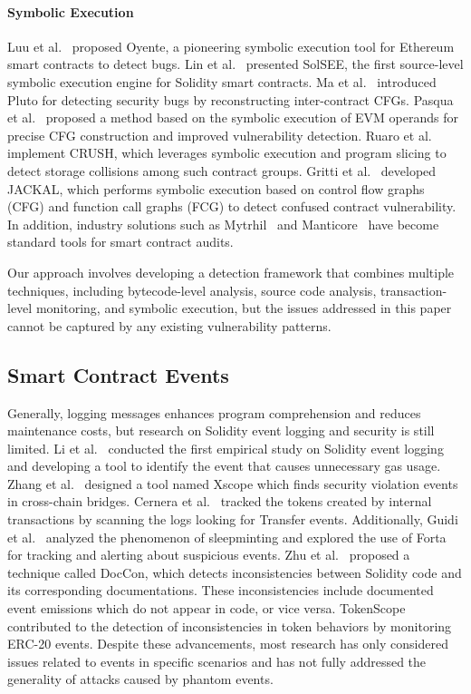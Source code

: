 \paragraph{Symbolic Execution}
Luu et al.~\cite{luu2016making} proposed Oyente, a pioneering symbolic execution tool for Ethereum smart contracts to detect bugs. Lin et al.~\cite{lin2022solsee} presented SolSEE, the first source-level symbolic execution engine for Solidity smart contracts. Ma et al.~\cite{ma2021pluto} introduced Pluto for detecting security bugs by reconstructing inter-contract CFGs. Pasqua et al.~\cite{pasqua2023enhancing} proposed a method based on the symbolic execution of EVM operands for precise CFG construction and improved vulnerability detection. Ruaro et al.~\cite{ruaro2024not} implement CRUSH, which leverages symbolic execution and program slicing to detect storage collisions among such contract groups. Gritti et al.~\cite{gritti2023confusum} developed JACKAL, which performs symbolic execution based on control flow graphs (CFG) and function call graphs (FCG) to detect confused contract vulnerability. In addition, industry solutions such as Mytrhil~\cite{mythril} and Manticore~\cite{mossberg2019manticore} have become standard tools for smart contract audits.

Our approach involves developing a detection framework that combines multiple techniques, including bytecode-level analysis, source code analysis, transaction-level monitoring, and symbolic execution, but the issues addressed in this paper cannot be captured by any existing vulnerability patterns.

\subsection{Smart Contract Events}
Generally, logging messages enhances program comprehension and reduces maintenance costs, but
research on Solidity event logging and security is still limited. Li et
al.~\cite{li2023understanding} conducted the first empirical study on Solidity event logging and
developing a tool to identify the event that causes unnecessary gas usage. Zhang et
al.~\cite{Xscope} designed a tool named Xscope which finds
security violation events in cross-chain bridges. Cernera et al.~\cite{cernera2023token} tracked
the tokens created by internal transactions by scanning the logs looking for Transfer events.
Additionally, Guidi et al.~\cite{sleepminting} analyzed the phenomenon of sleepminting and explored the use of Forta for
tracking and alerting about suspicious events.
Zhu et al.~\cite{doccon} proposed a technique called DocCon, which detects inconsistencies between
Solidity code and its corresponding documentations. These inconsistencies include documented event
emissions which do not appear in code, or vice versa.
TokenScope \cite{TokenScope} contributed to the detection of inconsistencies in token behaviors by monitoring ERC-20 events.
Despite these advancements, most research has only considered issues related to events in specific
scenarios and has not fully addressed the generality of attacks caused by phantom events.

